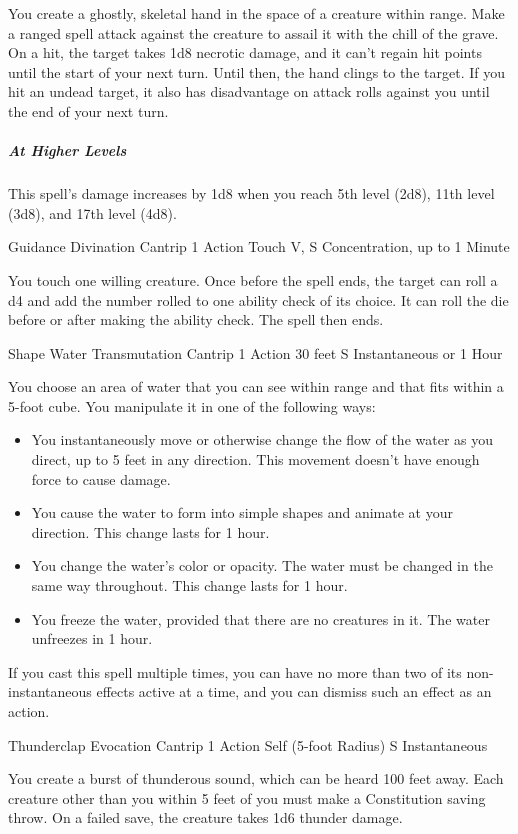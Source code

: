 {You create a ghostly, skeletal hand in the space of a creature within range. Make a ranged spell attack against the creature to assail it with the chill of the grave. On a hit, the target takes 1d8 necrotic damage, and it can’t regain hit points until the start of your next turn. Until then, the hand clings to the target. If you hit an undead target, it also has disadvantage on attack rolls against you until the end of your next turn.

\subparagraph*{At Higher Levels} This spell’s damage increases by 1d8 when you reach 5th level (2d8), 11th level (3d8), and 17th level (4d8).

\DndSpellHeader
  {Guidance}
  {Divination Cantrip}
  {1 Action}
  {Touch}
  {V, S}
  {Concentration, up to 1 Minute}

You touch one willing creature. Once before the spell ends, the target can roll a d4 and add the number rolled to one ability check of its choice. It can roll the die before or after making the ability check. The spell then ends.

\DndSpellHeader
  {Shape Water}
  {Transmutation Cantrip}
  {1 Action}
  {30 feet}
  {S}
  {Instantaneous or 1 Hour}

You choose an area of water that you can see within range and that fits within a 5-foot cube. You manipulate it in one of the following ways:

\begin{itemize}
	\item You instantaneously move or otherwise change the flow of the water as you direct, up to 5 feet in any direction. This movement doesn’t have enough force to cause damage.
	\item You cause the water to form into simple shapes and animate at your direction. This change lasts for 1 hour.
	\item You change the water’s color or opacity. The water must be changed in the same way throughout. This change lasts for 1 hour.
	\item You freeze the water, provided that there are no creatures in it. The water unfreezes in 1 hour.
\end{itemize}
If you cast this spell multiple times, you can have no more than two of its non-instantaneous effects active at a time, and you can dismiss such an effect as an action.

\DndSpellHeader
  {Thunderclap}
  {Evocation Cantrip}
  {1 Action}
  {Self (5-foot Radius)}
  {S}
  {Instantaneous}

You create a burst of thunderous sound, which can be heard 100 feet away. Each creature other than you within 5 feet of you must make a Constitution saving throw. On a failed save, the creature takes 1d6 thunder damage.

}
